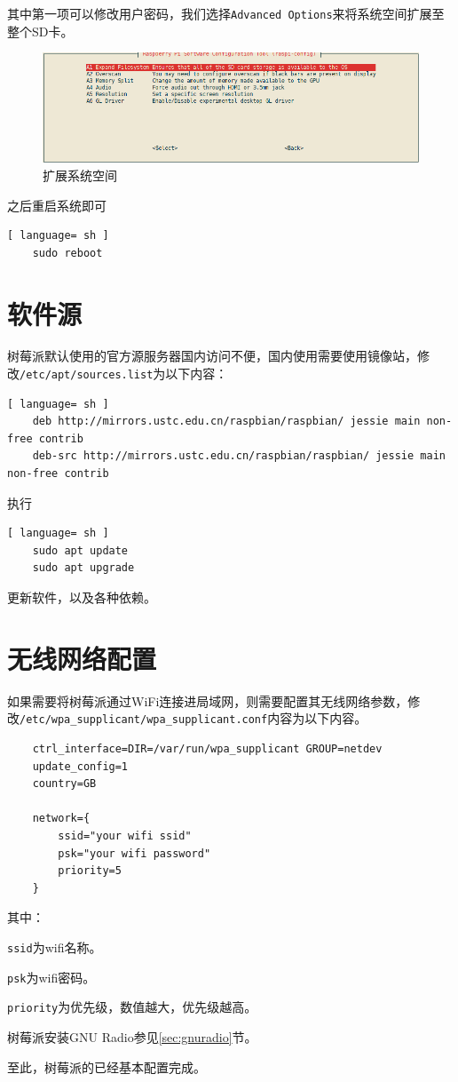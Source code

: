 		\par 其中第一项可以修改用户密码，我们选择\lstinline{Advanced Options}来将系统空间扩展至整个SD卡。
		\begin{figure}[htp]
			\centering
			\includegraphics[width=13cm]{figures/raspi-config-expand-filesystem.png}
			\caption{扩展系统空间}
			\label{fig:raspi_config_expand_filesystem}
		\end{figure}
		\par 之后重启系统即可
		\begin{lstlisting}[ language= sh ]
	sudo reboot
		\end{lstlisting}
	\section{软件源}
		\par 树莓派默认使用的官方源服务器国内访问不便，国内使用需要使用镜像站，修改\lstinline[language=sh]{/etc/apt/sources.list}为以下内容：
		\begin{lstlisting}[ language= sh ]
	deb http://mirrors.ustc.edu.cn/raspbian/raspbian/ jessie main non-free contrib 
	deb-src http://mirrors.ustc.edu.cn/raspbian/raspbian/ jessie main non-free contrib
		\end{lstlisting}
		\par 执行
		\begin{lstlisting}[ language= sh ]
	sudo apt update
	sudo apt upgrade
		\end{lstlisting}
		\par 更新软件，以及各种依赖。
	\section{无线网络配置}
		\par 如果需要将树莓派通过WiFi连接进局域网，则需要配置其无线网络参数，修改\lstinline[language=sh]{/etc/wpa_supplicant/wpa_supplicant.conf}内容为以下内容。
		\begin{lstlisting}
	ctrl_interface=DIR=/var/run/wpa_supplicant GROUP=netdev
	update_config=1
	country=GB

	network={
		ssid="your wifi ssid"
		psk="your wifi password"
		priority=5
	}
		\end{lstlisting}
		\par 其中：
		\par \lstinline{ssid}为wifi名称。
		\par \lstinline{psk}为wifi密码。
		\par \lstinline{priority}为优先级，数值越大，优先级越高。
		\par 树莓派安装GNU Radio参见\ref{sec:gnuradio}节。
		\par 至此，树莓派的已经基本配置完成。
